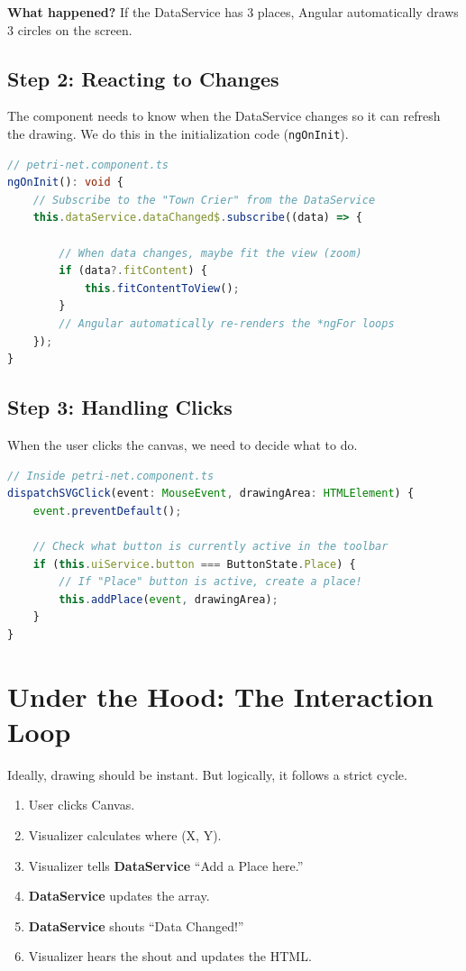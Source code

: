 \documentclass[a4paper,11pt,oneside]{report}
\begin{document}
\textbf{What happened?} If the DataService has 3 places, Angular automatically draws 3 circles on the screen.

\subsection{Step 2: Reacting to Changes}

The component needs to know when the DataService changes so it can refresh the drawing. We do this in the initialization code (\texttt{ngOnInit}).

\begin{lstlisting}[language=TypeScript]
// petri-net.component.ts
ngOnInit(): void {
    // Subscribe to the "Town Crier" from the DataService
    this.dataService.dataChanged$.subscribe((data) => {
        
        // When data changes, maybe fit the view (zoom) 
        if (data?.fitContent) {
            this.fitContentToView();
        }
        // Angular automatically re-renders the *ngFor loops
    });
}
\end{lstlisting}

\subsection{Step 3: Handling Clicks}

When the user clicks the canvas, we need to decide what to do.

\begin{lstlisting}[language=TypeScript]
// Inside petri-net.component.ts
dispatchSVGClick(event: MouseEvent, drawingArea: HTMLElement) {
    event.preventDefault();

    // Check what button is currently active in the toolbar
    if (this.uiService.button === ButtonState.Place) {
        // If "Place" button is active, create a place!
        this.addPlace(event, drawingArea);
    }
}
\end{lstlisting}

\section{Under the Hood: The Interaction Loop}

Ideally, drawing should be instant. But logically, it follows a strict cycle.

\begin{enumerate}
    \item User clicks Canvas.
    \item Visualizer calculates where (X, Y).
    \item Visualizer tells \textbf{DataService} ``Add a Place here.''
    \item \textbf{DataService} updates the array.
    \item \textbf{DataService} shouts ``Data Changed!''
    \item Visualizer hears the shout and updates the HTML.
\end{enumerate}
\end{document}
